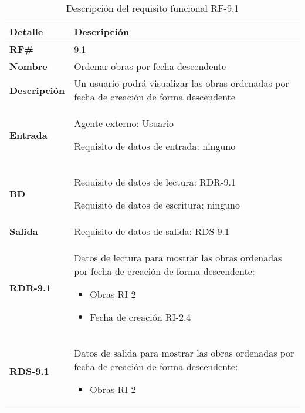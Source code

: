 \begin{table}[H]
    \centering
    \begin{tabular}{|p{3cm}|p{8cm}|}
        \hline
        \rowcolor{lightgray}
        \textbf{Detalle} & \textbf{Descripción} \\
        \hline
        \textbf{RF\#} & 9.1 \\
        \hline
        \textbf{Nombre} & Ordenar obras por fecha descendente \\
        \hline
        \textbf{Descripción} & Un usuario podrá visualizar las obras ordenadas
        por fecha de creación de forma descendente \\
        \hline
        \textbf{Entrada} &
        Agente externo: Usuario
        
        Requisito de datos de entrada: ninguno \\
        \hline
        \textbf{BD} &
        Requisito de datos de lectura: RDR-9.1
        
        Requisito de datos de escritura: ninguno \\
        \hline
        \textbf{Salida} & Requisito de datos de salida: RDS-9.1 \\
        \hline
        \textbf{RDR-9.1} & Datos de lectura para mostrar las obras ordenadas por fecha
        de creación de forma descendente:
            \begin{itemize}
                \item Obras RI-2
                \item Fecha de creación RI-2.4
            \end{itemize} \\
        \hline
        \textbf{RDS-9.1} & Datos de salida para mostrar las obras ordenadas por fecha
        de creación de forma descendente:
            \begin{itemize}
                \item Obras RI-2
            \end{itemize} \\
        \hline
    \end{tabular}
    \caption{Descripción del requisito funcional RF-9.1}
    \label{tab:rf-9-1}
\end{table}


